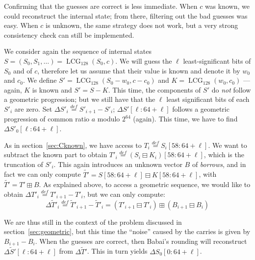 \documentclass[journal=tosc,final]{iacrtrans}
\DeclareMathOperator{\LCG}{LCG}
\begin{document}
Confirming that the guesses are correct is less immediate. When $c$ was known,
we could reconstruct the internal state; from there, filtering out the bad
guesses was easy. When $c$ is unknown, the same strategy does not work, but a
very strong consistency check can still be implemented. %

We consider again the sequence of internal states
$S = (S_0, S_1, \dots) = \LCG_{128}(S_0, c)$. We will guess the $\ell$
least-significant bits of $S_0$ and of $c$, therefore let us assume that their
value is known and denote it by $w_0$ and $c_0$. We define
$S' = \LCG_{128}(S_0 - w_0, c - c_0)$ and $K = \LCG_{128}(w_0, c_0)$ --- again,
$K$ is known and $S' = S - K$. This time, the components of $S'$ do \emph{not}
follow a geometric progression; but we still have that the $\ell$ least
significant bits of each $S'_i$ are zero. Set
$\Delta S'_i \stackrel{def}{=} S'_{i+1} - S'_i$; $\Delta S'[\ell:64+\ell]$
follows a geometric progression of common ratio $a$ modulo $2^{64}$
(again). This time, we have to find $\Delta S'_0[\ell:64+\ell]$.

As in section~\ref{sec:Cknown}, we have access to
$T_i \stackrel{def}{=} S_i[58:64+\ell]$. We want to subtract the known part to
obtain $T'_i \stackrel{def}{=} (S_i \boxminus K_i)[58:64+\ell]$, which is the
truncation of $S'_i$. This again introduces an unknown vector $B$ of
\emph{borrows}, and in fact we can only compute
$\widetilde{T'} = S[58:64+\ell] \boxminus K[58:64+\ell]$, with
$\widetilde{T'} = T' \boxplus B$. As explained above, to access a geometric
sequence, we would like to obtain
$\Delta T'_i \stackrel{def}{=} T'_{i+1} - T'_i$, but we can only compute:
\[
  \Delta \widetilde{T}'_i \stackrel{def}{=} \widetilde{T}'_{i+1} - \widetilde{T}'_i
  =  (T'_{i+1} \boxminus T'_{i}) \boxplus (B_{i+1} \boxminus B_{i})
\]

We are thus still in the context of the problem discussed in
section~\ref{sec:geometric}, but this time the ``noise'' caused by the carries
is given by $B_{i+1} - B_i$. When the guesses are correct, then Babai's rounding
will reconstruct $\Delta \widetilde{S}'[\ell:64+\ell]$ from
$\Delta \widetilde{T}'$. This in turn yields $\Delta S_0[0:64+\ell]$.
\end{document}
